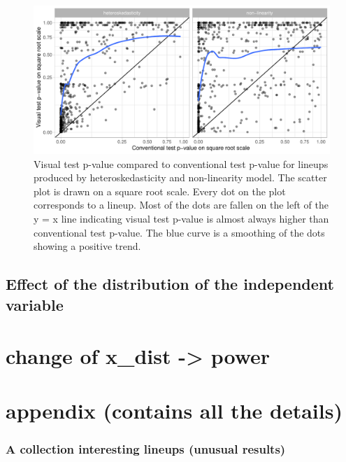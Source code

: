 \documentclass[]{interact}
\theoremstyle{plain}%
\theoremstyle{definition}
\theoremstyle{remark}
\begin{document}
\begin{figure}

{\centering \includegraphics[width=1\linewidth]{paper_comparison_files/figure-latex/p-value-comparison-1} 

}

\caption{Visual test p-value compared to conventional test p-value for lineups produced by heteroskedasticity and non-linearity model. The scatter plot is drawn on a square root scale. Every dot on the plot corresponds to a lineup. Most of the dots are fallen on the left of the y = x line indicating visual test p-value is almost always higher than conventional test p-value. The blue curve is a smoothing of the dots showing a positive trend. }\label{fig:p-value-comparison}
\end{figure}

\hypertarget{effect-of-the-distribution-of-the-independent-variable}{%
\subsection{Effect of the distribution of the independent
variable}\label{effect-of-the-distribution-of-the-independent-variable}}

\hypertarget{change-of-x_dist---power}{%
\section{change of x\_dist -\textgreater{}
power}\label{change-of-x_dist---power}}

\hypertarget{appendix-contains-all-the-details}{%
\section{appendix (contains all the
details)}\label{appendix-contains-all-the-details}}

\hypertarget{a-collection-interesting-lineups-unusual-results}{%
\subsubsection{A collection interesting lineups (unusual
results)}\label{a-collection-interesting-lineups-unusual-results}}
\end{document}
